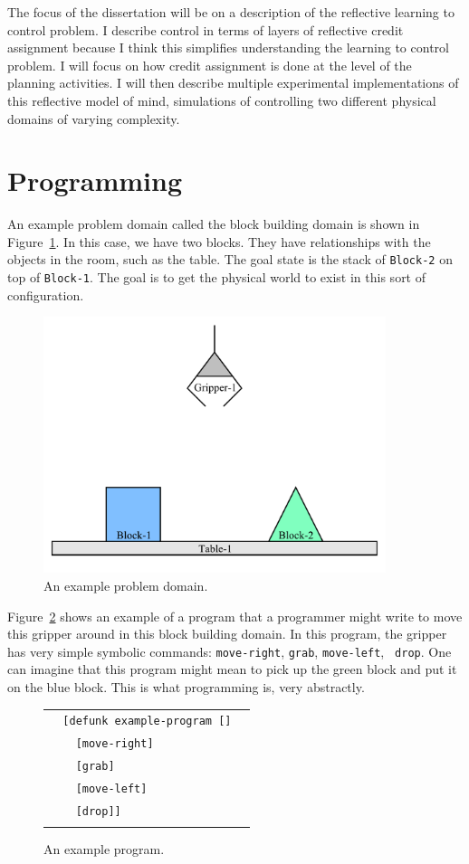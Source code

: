 The focus of the dissertation will be on a description of the
reflective learning to control problem.  I describe control in terms
of layers of reflective credit assignment because I think this
simplifies understanding the learning to control problem.  I will
focus on how credit assignment is done at the level of the planning
activities.  I will then describe multiple experimental
implementations of this reflective model of mind, simulations of
controlling two different physical domains of varying complexity.

\section{Programming}

An example problem domain called the block building domain is shown in
Figure~\ref{figure:example_problem_domain}.  In this case, we have two
blocks.  They have relationships with the objects in the room, such as
the table.  The goal state is the stack of {\tt Block-2} on top of
{\tt Block-1}.  The goal is to get the physical world to exist in this
sort of configuration.
\begin{figure}
\center
\includegraphics[width=10cm]{gfx/blocks_world_example-1}
\caption{An example problem domain.}
\label{figure:example_problem_domain}
\end{figure}

Figure~\ref{figure:example_program} shows an example of a program that
a programmer might write to move this gripper around in this block
building domain.  In this program, the gripper has very simple
symbolic commands: {\tt move-right}, {\tt grab}, {\tt move-left}, {\tt
  drop}.  One can imagine that this program might mean to pick up the
green block and put it on the blue block.  This is what programming
is, very abstractly.
\begin{figure}
\center
\begin{tabular}{l}
\\
  {\tt ~~[defunk example-program []}~~ \\
  {\tt ~~~~[move-right]} ~~\\
  {\tt ~~~~[grab]} ~~\\
  {\tt ~~~~[move-left]} ~~\\
  {\tt ~~~~[drop]]} ~~\\
\\
\end{tabular}
\caption{An example program.}
\label{figure:example_program}
\end{figure}

